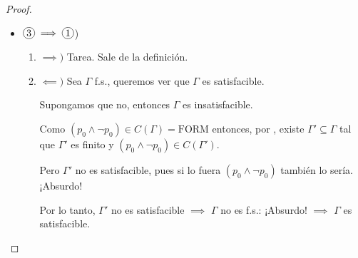 \begin{proof}
\begin{itemize}




        \item $\circled{3} \implies \circled{1}$) 
            \begin{enumerate}[%
                            labelindent=*,
                            style=multiline,
                            leftmargin=*,
                            align=left,
                            leftmargin=2\parindent,
                            label=Caso \arabic*)]
                \item $\implies)$ Tarea. Sale de la definición.
                \item $\impliedby)$ Sea $\Gamma$ f.s., queremos ver que
                    $\Gamma$ es satisfacible.

                    Supongamos que no, entonces $\Gamma$ es insatisfacible.

                    Como $(p_0 \wedge \neg p_0) \in C(\Gamma) = \mathrm{FORM}$
                    entonces, por , existe 
                    $\Gamma' \subseteq \Gamma$ tal que $\Gamma'$ es finito
                    y $(p_0 \wedge \neg p_0) \in C(\Gamma')$.

                    Pero $\Gamma'$ no es satisfacible, pues si lo fuera
                    $(p_0 \wedge \neg p_0)$ también lo sería. ¡Absurdo!

                    Por lo tanto, $\Gamma'$ no es satisfacible $\implies$
                    $\Gamma$ no es f.s.: ¡Absurdo! $\implies$ $\Gamma$ es
                    satisfacible.
            \end{enumerate}
    \end{itemize}
\end{proof}

